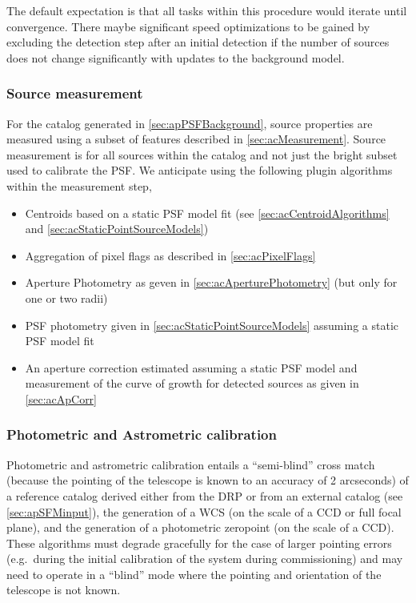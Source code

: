 The default expectation is that all tasks within this procedure would iterate until convergence.  There maybe significant speed optimizations to be gained by excluding the \Source detection step after an initial detection if the number of sources does not change significantly with updates to the background model.

\subsubsection{Source measurement}
\label{sec:apSourcemeasurement}

For the \Source catalog generated in \ref{sec:apPSFBackground}, source properties are measured using a subset of features described in \ref{sec:acMeasurement}. Source measurement is for all sources within the \Source catalog and not just the bright subset used to calibrate the PSF.  We anticipate using the following plugin algorithms within the \Source measurement step,
\begin{itemize}
\item Centroids based on a static PSF model fit (see \ref{sec:acCentroidAlgorithms} and \ref{sec:acStaticPointSourceModels})
\item Aggregation of pixel flags as described in \ref{sec:acPixelFlags}
\item Aperture Photometry as geven in \ref{sec:acAperturePhotometry} (but only for one or two radii)
\item PSF photometry given in \ref{sec:acStaticPointSourceModels} assuming a static PSF model fit
\item  An aperture correction estimated assuming a static PSF model and measurement of the curve of growth for  detected sources as given in \ref{sec:acApCorr}
\end{itemize}

\subsubsection{Photometric and Astrometric calibration}

Photometric and astrometric calibration entails a ``semi-blind'' cross match (because the pointing of the telescope is known to an accuracy of 2 arcseconds) of a reference catalog derived either from the DRP \Objects or from an external catalog (see \ref{sec:apSFMinput}), the generation of a WCS (on the scale of a CCD or full focal plane), and the generation of a photometric zeropoint (on the scale of a CCD). These algorithms must degrade gracefully for the case of larger pointing errors (e.g.\ during the initial calibration of the system during commissioning) and may need to operate in a ``blind'' mode where the pointing and orientation of the telescope is not known.

